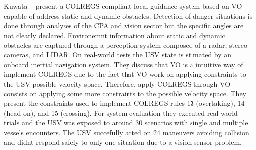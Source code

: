 Kuwata \etal~\cite{Kuwata2014Safe} present a COLREGS-compliant local guidance system based on \ac{VO} capable of address static and dynamic obstacles.
Detection of danger situations is done through analyses of the \ac{CPA} and vision sector but the specific angles are not clearly declared.
Environemnt information about static and dynamic obstacles are captured through a perception system composed of a radar, stereo cameras, and \ac{LIDAR}.
On real-world tests the \ac{USV} state is stimated by an onboard inertial navigation system.
They discuss that \ac{VO} is a intuitive way of implement COLREGS due to the fact that \ac{VO} work on applying constraints to the \ac{USV} possible velocity space.
Therefore, apply COLREGS through \ac{VO} consists on applying some more constraints to the possible velocity space.
They present the constraints used to implement COLREGS rules 13 (overtaking), 14 (head-on), and 15 (crossing).
For system evaluation they executed real-world trials and the \ac{USV} was exposed to around 30 scenarios with single and multiple vessels encounters. 
The \ac{USV} succefully acted on 24 maneuvers avoiding collision and didnt respond safely to only one situation due to a vision sensor problem.


